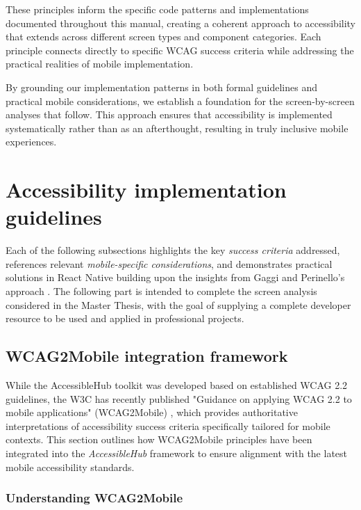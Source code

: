 These principles inform the specific code patterns and implementations documented throughout this manual, creating a coherent approach to accessibility that extends across different screen types and component categories. Each principle connects directly to specific WCAG success criteria while addressing the practical realities of mobile implementation.

By grounding our implementation patterns in both formal guidelines and practical mobile considerations, we establish a foundation for the screen-by-screen analyses that follow. This approach ensures that accessibility is implemented systematically rather than as an afterthought, resulting in truly inclusive mobile experiences.

\section{Accessibility implementation guidelines}
\label{sec:implementation-guidelines}

Each of the following subsections highlights the key \textit{success criteria} addressed, references relevant \textit{mobile-specific considerations}, and demonstrates practical solutions in React Native building upon the insights from Gaggi and Perinello's approach \cite{budai2024mobile}. The following part is intended to complete the screen analysis considered in the Master Thesis, with the goal of supplying a complete developer resource to be used and applied in professional projects.

\subsection{WCAG2Mobile integration framework}
\label{sec:wcag2mobile-framework}

While the AccessibleHub toolkit was developed based on established WCAG 2.2 guidelines, the W3C has recently published "Guidance on applying WCAG 2.2 to mobile applications" (WCAG2Mobile) \cite{w3c-wcag2mobile}, which provides authoritative interpretations of accessibility success criteria specifically tailored for mobile contexts. This section outlines how WCAG2Mobile principles have been integrated into the \textit{AccessibleHub} framework to ensure alignment with the latest mobile accessibility standards.

\subsubsection{Understanding WCAG2Mobile}

